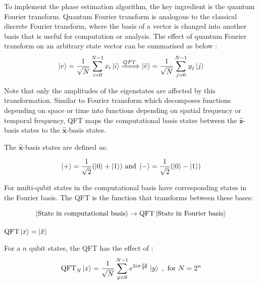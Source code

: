 \documentclass{article}
\begin{document}
To implement the phase estimation algorithm, the key ingredient is the quantum Fourier transform. Quantum Fourier transform is analogous to the classical discrete Fourier transform, where the basis of a vector is changed into another basis that is useful for computation or analysis. The effect of quantum Fourier transform on an arbitrary state vector can be summarised as below \cite{nielsen_quantum_2010}:
\begin{equation}
    \ket{v} = \frac{1}{\sqrt{N}} \sum_{i=0}^{N-1}{x_i \ket{i}} \xRightarrow{QFT} \ket{\Tilde{v}} = \frac{1}{\sqrt{N}}\sum_{j=0}^{N-1} y_j \ket{j}
\end{equation} 

\noindent
Note that only the amplitudes of the eigenstates are affected by this transformation. Similar to Fourier transform which decomposes functions depending on space or time into functions depending on spatial frequency or temporal frequency, QFT maps the computational basis states between the $\hat{\textbf{z}}$-basis states to the $\hat{\textbf{x}}$-basis states.
\vspace{5mm}

\noindent
The $\hat{\textbf{x}}$-basis states are defined as:
\vspace{5mm}

\begin{equation}
\ket{+} = \frac{1}{\sqrt{2}}(\ket{0} + \ket{1}) \ \text{and} \ \ket{-} = \frac{1}{\sqrt{2}}(\ket{0} - \ket{1})   
\end{equation}

\pagebreak

\noindent
For multi-qubit states in the computational basis have corresponding states in the Fourier basis. The QFT is the function that transforms between these bases\cite{noauthor_quantum_nodate-1}:
\vspace{5mm}

\begin{equation}
\ket{\text{State in computational basis}} \rightarrow{\text{QFT}} \ket{\text{State in Fourier basis}}  
\end{equation}
\vspace{5mm}

\qquad $\text{QFT}\ket{x} = \ket{\tilde{x}}$
\vspace{5mm}

For a $n$ qubit states, the QFT has the effect of \cite{nielsen_quantum_2010}:
\vspace{5mm}
\begin{equation}
\text{QFT}_N\ket{x} = \frac{1}{\sqrt{N}} \sum\limits_{y=0}^{N-1}e^{2i\pi\frac{xy}{2^n}}\ket{y} \ , \ \text{for} \ N = 2^n    
\end{equation}
\end{document}
